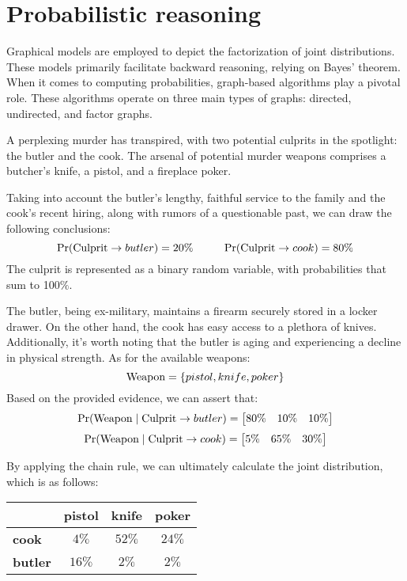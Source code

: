 \section{Probabilistic reasoning}

Graphical models are employed to depict the factorization of joint distributions. 
These models primarily facilitate backward reasoning, relying on Bayes' theorem. 
When it comes to computing probabilities, graph-based algorithms play a pivotal role. 
These algorithms operate on three main types of graphs: directed, undirected, and factor graphs.
\begin{example}
    A perplexing murder has transpired, with two potential culprits in the spotlight: the butler and the cook. 
    The arsenal of potential murder weapons comprises a butcher's knife, a pistol, and a fireplace poker.

    Taking into account the butler's lengthy, faithful service to the family and the cook's recent hiring, along with rumors of a questionable past, we can draw the following conclusions:
    \[\Pr(\textnormal{Culprit}\rightarrow butler)=20\% \:\:\:\:\:\:\:\:\:\:\:\: \Pr(\textnormal{Culprit}\rightarrow cook)=80\%\]
    The culprit is represented as a binary random variable, with probabilities that sum to 100$\%$.

    The butler, being ex-military, maintains a firearm securely stored in a locker drawer. 
    On the other hand, the cook has easy access to a plethora of knives. 
    Additionally, it's worth noting that the butler is aging and experiencing a decline in physical strength. 
    As for the available weapons:        
    \[\textnormal{Weapon}=\{pistol,knife,poker\}\]
    Based on the provided evidence, we can assert that:
    \[\Pr(\textnormal{Weapon}\mid \textnormal{Culprit}\rightarrow butler)=\begin{bmatrix} 80\% & 10\% & 10\% \end{bmatrix}\]
    \[\Pr(\textnormal{Weapon}\mid \textnormal{Culprit}\rightarrow cook)=\begin{bmatrix} 5\% & 65\% & 30\% \end{bmatrix}\]
    
    By applying the chain rule, we can ultimately calculate the joint distribution, which is as follows:
    \begin{table}[H]
        \centering
        \begin{tabular}{c|ccc|}
        \cline{2-4}
                                                & \textbf{pistol} & \textbf{knife} & \textbf{poker} \\ \hline
        \multicolumn{1}{|l|}{\textbf{cook}}   & $4\%$           & $52\%$         & $24\%$         \\
        \multicolumn{1}{|l|}{\textbf{butler}} & $16\%$          & $2\%$          & $2\%$          \\ \hline
        \end{tabular}
    \end{table}


\end{example}
